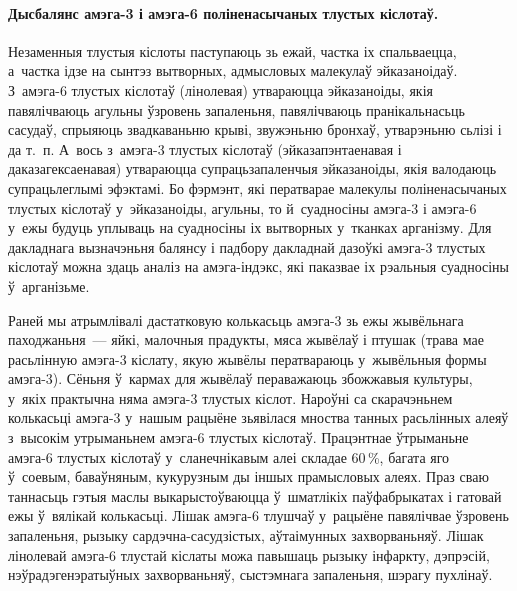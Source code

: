 \paragraph{Дысбалянс амэга-3 і амэга-6 поліненасычаных тлустых кіслотаў.}
Незаменныя тлустыя кіслоты паступаюць зь ежай, частка іх спальваецца, а~частка ідзе на сынтэз вытворных, адмысловых малекулаў эйказаноідаў. З~амэга-6 тлустых кіслотаў (лінолевая) утвараюцца эйказаноіды, якія павялічваюць агульны ўзровень запаленьня, павялічваюць пранікальнасьць сасудаў, спрыяюць звадкаваньню крыві, звужэньню бронхаў, утварэньню сьлізі і да т.~п. А~вось з~амэга-3 тлустых кіслотаў (эйказапэнтаенавая і даказагексаенавая) утвараюцца супрацьзапаленчыя эйказаноіды, якія валодаюць супрацьлеглымі эфэктамі. Бо фэрмэнт, які ператварае малекулы поліненасычаных тлустых кіслотаў у~эйказаноіды, агульны, то й~суадносіны амэга-3 і амэга-6 у~ежы будуць уплываць на суадносіны іх вытворных у~тканках арганізму. Для дакладнага вызначэньня балянсу і падбору дакладнай дазоўкі амэга-3 тлустых кіслотаў можна здаць аналіз на амэга-індэкс, які паказвае іх рэальныя суадносіны ў~арганізьме.


Раней мы атрымлівалі дастатковую колькасьць амэга-3 зь ежы жывёльнага паходжаньня~--- яйкі, малочныя прадукты, мяса жывёлаў і птушак (трава мае расьлінную амэга-3 кіслату, якую жывёлы ператвараюць у~жывёльныя формы амэга-3). Сёньня ў~кармах для жывёлаў пераважаюць збожжавыя культуры, у~якіх практычна няма амэга-3 тлустых кіслот. Нароўні са скарачэньнем колькасьці амэга-3 у~нашым рацыёне зьявілася мноства танных расьлінных алеяў з~высокім утрыманьнем амэга-6 тлустых кіслотаў. Працэнтнае ўтрыманьне амэга-6 тлустых кіслотаў у~сланечнікавым алеі складае 60\,\%, багата яго ў~соевым, баваўняным, кукурузным ды іншых прамысловых алеях. Праз сваю таннасьць гэтыя маслы выкарыстоўваюцца ў~шматлікіх паўфабрыкатах і гатовай ежы ў~вялікай колькасьці. Лішак амэга-6 тлушчаў у~рацыёне павялічвае ўзровень запаленьня, рызыку сардэчна-сасудзістых, аўтаімунных захворваньняў. Лішак лінолевай амэга-6 тлустай кіслаты можа павышаць рызыку інфаркту, дэпрэсій, нэўрадэгенэратыўных захворваньняў, сыстэмнага запаленьня, шэрагу пухлінаў.

